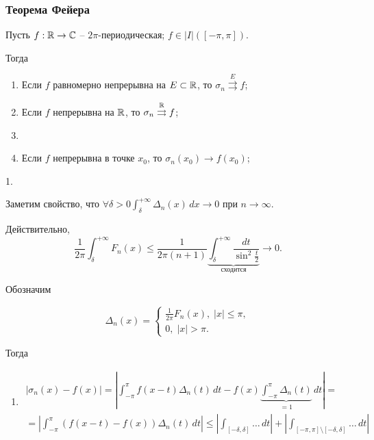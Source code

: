 \subsubsection{Теорема Фейера}

Пусть $f: \mathbb{R} \to \mathbb{C}$ -- $2\pi$-периодическая; $f \in |I|([-\pi, \pi])$.

Тогда 
\begin{enumerate}
    \item Если $f$ равномерно непрерывна на $E \subset \mathbb{R}$, то $\sigma_n \overset{E}{\rightrightarrows} f$;
    \item Если $f$ непрерывна на $\mathbb{R}$, то $\sigma_n \overset{\mathbb{R}}{\rightrightarrows} f$;
    \item \item Если $f$ непрерывна в точке $x_0$, то $\sigma_n(x_0) \rightarrow f(x_0)$;
\end{enumerate}

\Proof

1.

Заметим свойство, что $\forall \delta > 0 \int_\delta^{+\infty} \Delta_n(x) \,dx \to 0$ при $n \to \infty$.  

Действительно, 
\begin{equation*}    
    \frac{1}{2\pi} \int_\delta^{+\infty} F_n(x) \leq \frac{1}{2\pi (n+1)} \underbrace{\int_\delta^{+\infty} \frac{dt}{\sin^2 \frac{t}{2}}}_{\text{сходится}} \to 0.
\end{equation*}

Обозначим

\begin{equation*}
    \Delta_n(x) = 
    \begin{cases}
        \frac{1}{2\pi} F_n(x), \; |x| \leq \pi, \\
        0, \; |x| > \pi.
    \end{cases}
\end{equation*}

Тогда

\begin{enumerate}
    \item 
    \begin{gather*}
        |\sigma_n(x) - f(x)| = |\int_{-\pi}^\pi f(x-t) \Delta_n(t) \,dt - f(x) \underbrace{\int_{-\pi}^\pi \Delta_n(t)}_{=1} \,dt| = \\
        = |\int_{-\pi}^\pi \left(f(x-t)-f(x)\right) \Delta_n(t) \,dt| \leq |\int_{[-\delta, \delta]} \dots \,dt| + |\int_{[-\pi, \pi] \setminus [-\delta, \delta]} \dots \,dt|
    \end{gather*}
\end{enumerate}

